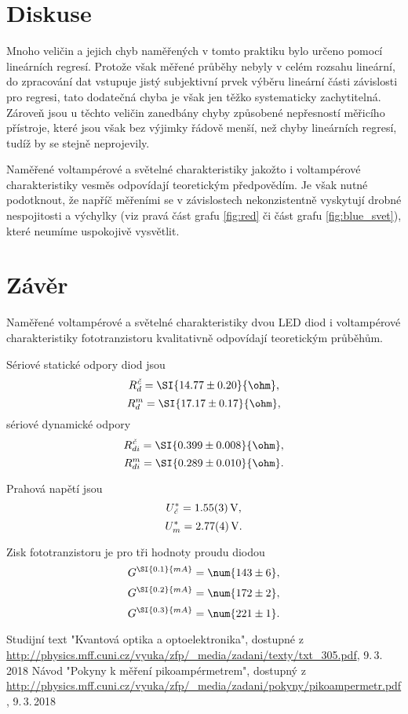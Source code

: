 \documentclass{protokol}
\begin{document}
  \section*{Diskuse}

    Mnoho veličin a jejich chyb naměřených v tomto praktiku bylo určeno pomocí lineárních regresí. Protože však měřené průběhy nebyly v celém rozsahu lineární, do zpracování dat vstupuje jistý subjektivní prvek výběru lineární části závislosti pro regresi, tato dodatečná chyba je však jen těžko systematicky zachytitelná. Zároveň jsou u těchto veličin zanedbány chyby způsobené nepřesností měřicího přístroje, které jsou však bez výjimky řádově menší, než chyby lineárních regresí, tudíž by se stejně neprojevily.

    Naměřené voltampérové a světelné charakteristiky jakožto i voltampérové charakteristiky vesměs odpovídají teoretickým předpovědím. Je však nutné podotknout, že napříč měřeními se v závislostech nekonzistentně vyskytují drobné nespojitosti a výchylky (viz pravá část grafu \ref{fig:red} či část grafu \ref{fig:blue_svet}), které neumíme uspokojivě vysvětlit.

  \section*{Závěr}

    Naměřené voltampérové a světelné charakteristiky dvou LED diod i voltampérové charakteristiky fototranzistoru kvalitativně odpovídají teoretickým průběhům.

    Sériové statické odpory diod jsou
    $$ R_d^\textit{č} = \SI{14.77 \pm 0.20}{\ohm}, $$
    $$ R_d^m = \SI{17.17 \pm 0.17}{\ohm}, $$
    sériové dynamické odpory
    $$ R_{di}^\textit{č} = \SI{0.399 \pm 0.008}{\ohm},$$
    $$ R_{di}^m = \SI{0.289 \pm 0.010}{\ohm}.$$

    Prahová napětí jsou 
    $$ U_\textit{č}^* = \SI{1.55 \pm 0.03}{V}, $$
    $$ U_m^* = \SI{2.77 \pm 0.04}{V}. $$

    Zisk fototranzistoru je pro tři hodnoty proudu diodou
    $$ G^{\SI{0.1}{mA}} = \num{143 \pm 6}, $$
    $$ G^{\SI{0.2}{mA}} = \num{172 \pm 2}, $$
    $$ G^{\SI{0.3}{mA}} = \num{221 \pm 1}. $$

  \begin{thebibliography}{}

    Studijní text "Kvantová optika a optoelektronika", dostupné z \\ \url{http://physics.mff.cuni.cz/vyuka/zfp/_media/zadani/texty/txt_305.pdf}, 9.\,3.\,2018
    Návod "Pokyny k měření pikoampérmetrem", dostupný z\\ \url{http://physics.mff.cuni.cz/vyuka/zfp/_media/zadani/pokyny/pikoampermetr.pdf}, 9.\,3.\,2018
  
  \end{thebibliography}
\end{document}
